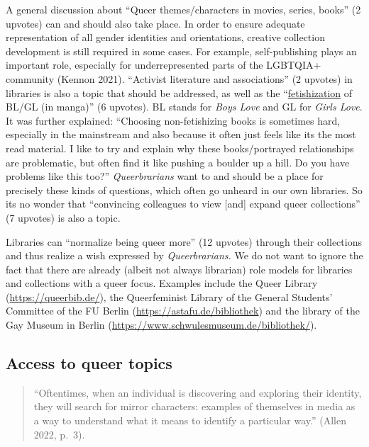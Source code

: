 \documentclass[a4paper,
fontsize=11pt,
oneside,
numbers=noperiodatend,
parskip=half-,
bibliography=totoc,
final
]{scrartcl}
\begin{document}
A general discussion about \enquote{Queer themes/characters in movies, series,
books} (2 upvotes) can and should also take place. In order to ensure
adequate representation of all gender identities and orientations,
creative collection development is still required in some cases. For
example, self-publishing plays an important role, especially for
underrepresented parts of the LGBTQIA+ community (Kennon 2021).
\enquote{Activist literature and associations} (2 upvotes) in libraries is also
a topic that should be addressed, as well as the
\enquote{\href{https://www.youthoutright.org/articles/fetishization-of-the-queer-community}{fetishization}
of BL/GL (in manga)} (6 upvotes). BL stands for \emph{Boys Love} and GL
for \emph{Girls Love}. It was further explained: \enquote{Choosing
non-fetishizing books is sometimes hard, especially in the mainstream
and also because it often just feels like it\textquotesingle s the most
read material. I like to try and explain why these books/portrayed
relationships are problematic, but often find it like pushing a boulder
up a hill. Do you have problems like this too?} \emph{Queerbrarians}
want to and should be a place for precisely these kinds of questions,
which often go unheard in our own libraries. So it\textquotesingle s no
wonder that \enquote{convincing colleagues to view {[}and{]} expand queer
collections} (7 upvotes) is also a topic.

Libraries can \enquote{normalize being queer more} (12 upvotes) through their
collections and thus realize a wish expressed by \emph{Queerbrarians.}
We do not want to ignore the fact that there are already (albeit not
always librarian) role models for libraries and collections with a queer
focus. Examples include the Queer Library (\url{https://queerbib.de/}),
the Queerfeminist Library of the General Students' Committee of the FU
Berlin (\url{https://astafu.de/bibliothek}) and the library of the Gay
Museum in Berlin (\url{https://www.schwulesmuseum.de/bibliothek/}).

\hypertarget{access-to-queer-topics}{%
\subsection{Access to queer topics}\label{access-to-queer-topics}}

\begin{quote}
\enquote{Oftentimes, when an individual is discovering and exploring their
identity, they will search for mirror characters: examples of themselves
in media as a way to understand what it means to identify a particular
way.} (Allen 2022, p.~3).
\end{quote}
\end{document}
